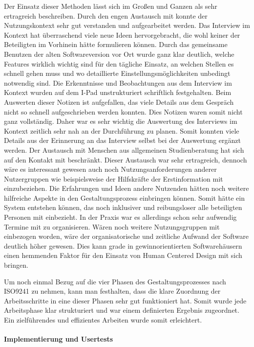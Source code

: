 Der Einsatz dieser Methoden lässt sich im Großen und Ganzen als sehr
ertragreich beschreiben. Durch den engen Austausch mit \ipName konnte der
Nutzungskontext sehr gut verstanden und aufgearbeitet werden. Das Interview im
Kontext hat überraschend viele neue Ideen hervorgebracht, die wohl keiner der
Beteiligten im Vorhinein hätte formulieren können. Durch das gemeinsame
Benutzen der alten Softwareversion vor Ort wurde ganz klar deutlich, welche
Features wirklich wichtig sind für den tägliche Einsatz, an welchen Stellen es
schnell gehen muss und wo detaillierte Einstellungsmöglichkeiten unbedingt
notwendig sind. Die Erkenntnisse und Beobachtungen aus dem Interview im Kontext
wurden auf dem I-Pad unstrukturiert schriftlich festgehalten. Beim Auswerten
dieser Notizen ist aufgefallen, das viele Details aus dem Gespräch nicht so
schnell aufgeschrieben werden konnten. Dies Notizen waren somit nicht ganz
vollständig. Daher war es sehr wichtig die Auswertung des Interviews im Kontext
zeitlich sehr nah an der Durchführung zu planen. Somit konnten viele Details
aus der Erinnerung an das Interview selbst bei der Auswertung ergänzt werden.
Der Austausch mit Menschen aus allgemeinen Studienberatung hat sich auf den
Kontakt mit \ipName beschränkt. Dieser Austausch war sehr ertragreich, dennoch
wäre es interessant gewesen auch noch Nutzungsanforderungen anderer
Nutzergruppen wie beispielsweise der Hilfskräfte der Erstinformation mit
einzubeziehen. Die Erfahrungen und Ideen andere Nutzenden hätten noch weitere
hilfreiche Aspekte in den Gestaltungsprozess einbringen können. Somit hätte ein
System entstehen können, das noch inklusiver und reibungsloser alle beteiligten
Personen mit einbezieht. In der Praxis war es allerdings schon sehr aufwendig
Termine mit \ipName zu organisieren. Wären noch weitere Nutzungsgruppen mit
einbezogen worden, wäre der organisatorische und zeitliche Aufwand der Software
deutlich höher gewesen. Dies kann grade in gewinnorientierten Softwarehäusern
einen hemmenden Faktor für den Einsatz von Human Centered Design mit sich
bringen.

Um noch einmal Bezug auf die vier Phasen des Gestaltungsprozesses nach ISO9241
zu nehmen, kann man festhalten, dass die klare Zuordnung der Arbeitsschritte in
eine dieser Phasen sehr gut funktioniert hat. Somit wurde jede Arbeitsphase
klar strukturiert und war einem definierten Ergebnis zugeordnet. Ein
zielführendes und effizientes Arbeiten wurde somit erleichtert.

\paragraph{Implementierung und Usertests}


